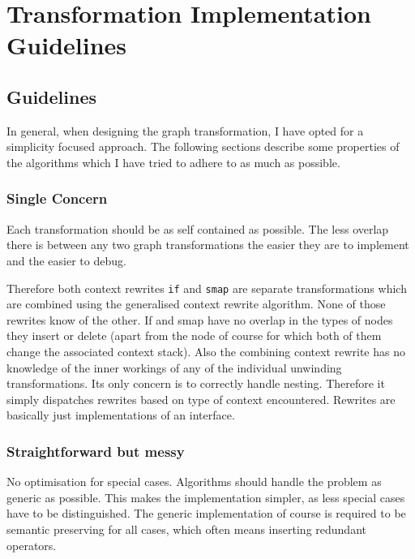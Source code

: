 \chapter{Transformation Implementation Guidelines}


\section{Guidelines}

In general, when designing the \yauhau{} graph transformation, I have opted for a simplicity focused approach.
The following sections describe some properties of the algorithms which I have tried to adhere to as much as possible.

\subsection{Single Concern}

Each transformation should be as self contained as possible.
The less overlap there is between any two graph transformations the easier they are to implement and the easier to debug.

Therefore both context rewrites \texttt{if} and \texttt{smap} are separate transformations which are combined using the generalised context rewrite algorithm.
None of those rewrites know of the other.
If and smap have no overlap in the types of nodes they insert or delete (apart from the \fetch{} node of course for which both of them change the associated context stack).
Also the combining context rewrite has no knowledge of the inner workings of any of the individual unwinding transformations.
Its only concern is to correctly handle nesting.
Therefore it simply dispatches rewrites based on type of context encountered.
Rewrites are basically just implementations of an interface.

\subsection{Straightforward but messy}

No optimisation for special cases.
Algorithms should handle the problem as generic as possible.
This makes the implementation simpler, as less special cases have to be distinguished.
The generic implementation of course is required to be semantic preserving for all cases, which often means inserting redundant operators.

